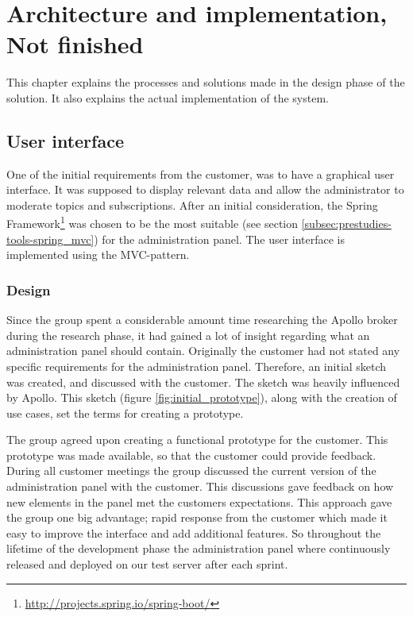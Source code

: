 
\chapter{Architecture and implementation, Not finished}
\label{ch:architecture_and_implementation}

This chapter explains the processes and solutions made in the design phase of the solution. It also explains the actual implementation of the system.

\section{User interface}
\label{sec:architecture_and_implementation-user_interface}

One of the initial requirements from the customer, was to have a graphical user interface. It was supposed to display relevant data and allow the administrator to moderate topics and subscriptions. After an initial consideration, the Spring Framework\footnote{\url{http://projects.spring.io/spring-boot/}} was chosen to be the most suitable (see section \ref{subsec:prestudies-tools-spring_mvc}) for the administration panel. The user interface is implemented using the MVC-pattern. 

\subsection{Design}
\label{subsec:architecture_and_implementation-user_interface-design}

Since the group spent a considerable amount time researching the Apollo broker during the research phase, it had gained a lot of insight regarding what an administration panel should contain. Originally the customer had not stated any specific requirements for the administration panel. Therefore, an initial sketch was created, and discussed with the customer. The sketch was heavily influenced by Apollo. This sketch (figure \ref{fig:initial_prototype}), along with the creation of use cases, set the terms for creating a prototype.

The group agreed upon creating a functional prototype for the customer. This prototype was made available, so that the customer could provide feedback. During all customer meetings the group discussed the current version of the administration panel with the customer. This discussions gave feedback on how new elements in the panel met the customers expectations. This approach gave the group one big advantage; rapid response from the customer which made it easy to improve the interface and add additional features. So throughout the lifetime of the development phase the administration panel where continuously released and deployed on our test server after each sprint.


